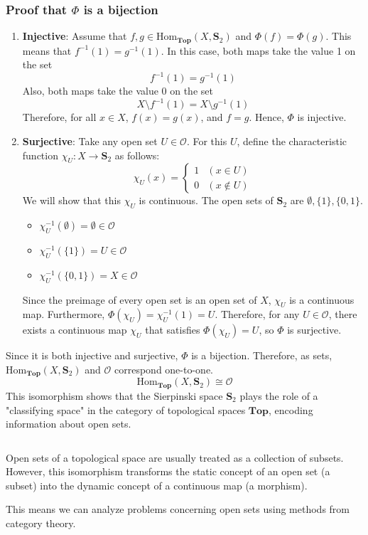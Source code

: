 \documentclass[article,letterpaper,12pt]{jsarticle}
\begin{document}
\subsubsection*{Proof that $\Phi$ is a bijection}

\begin{enumerate}
	\item \textbf{Injective}:
	      Assume that $f, g \in \mathrm{Hom}_{\mathbf{Top}}(X, \mathbf{S}_ {2})$ and $\Phi(f) = \Phi(g)$.
	      This means that $f^{-1}(1) = g^{-1}(1)$.
	      In this case, both maps take the value 1 on the set
	      $$ f^{-1}(1) = g^{-1}(1) $$
	      Also, both maps take the value 0 on the set
	      $$ X \setminus f^{-1}(1) = X \setminus g^{-1}(1) $$
	      Therefore, for all $x \in X$, $f(x) = g(x)$, and $f = g$.
	      Hence, $\Phi$ is injective.

	\item \textbf{Surjective}:
	      Take any open set $U \in \mathcal{O}$.
	      For this $U$, define the characteristic function $\chi_U: X \to \mathbf{S}_ {2}$ as follows:
	      $$ \chi_U(x) =
		      \begin{cases}
			      1 & (x \in U)    \\
			      0 & (x \notin U)
		      \end{cases}
	      $$
	      We will show that this $\chi_U$ is continuous.
	      The open sets of $\mathbf{S}_ {2}$ are $\emptyset, \{1\}, \{0, 1\}$.
	      \begin{itemize}
		      \item $\chi_U^{-1}(\emptyset) = \emptyset \in \mathcal{O}$
		      \item $\chi_U^{-1}(\{1\}) = U \in \mathcal{O}$
		      \item $\chi_U^{-1}(\{0, 1\}) = X \in \mathcal{O}$
	      \end{itemize}
	      Since the preimage of every open set is an open set of $X$, $\chi_U$ is a continuous map.
	      Furthermore, $\Phi(\chi_U) = \chi_U^{-1}(1) = U$.
	      Therefore, for any $U \in \mathcal{O}$, there exists a continuous map $\chi_U$ that satisfies $\Phi(\chi_U) = U$, so $\Phi$ is surjective.
\end{enumerate}

Since it is both injective and surjective, $\Phi$ is a bijection.
Therefore, as sets, $\mathrm{Hom}_{\mathbf{Top}}(X, \mathbf{S}_ {2})$ and $\mathcal{O}$ correspond one-to-one.
$$
	\mathrm{Hom}_{\mathbf{Top}}(X, \mathbf{S}_ {2}) \cong \mathcal{O}
$$
This isomorphism shows that the Sierpinski space $\mathbf{S}_ {2}$ plays the role of a "classifying space" in the category of topological spaces $\mathbf{Top}$, encoding information about open sets.

${}$

Open sets of a topological space are usually treated as a collection of subsets.
However, this isomorphism transforms the static concept of an open set (a subset) into the dynamic concept of a continuous map (a morphism).

This means we can analyze problems concerning open sets using methods from category theory.
\end{document}
